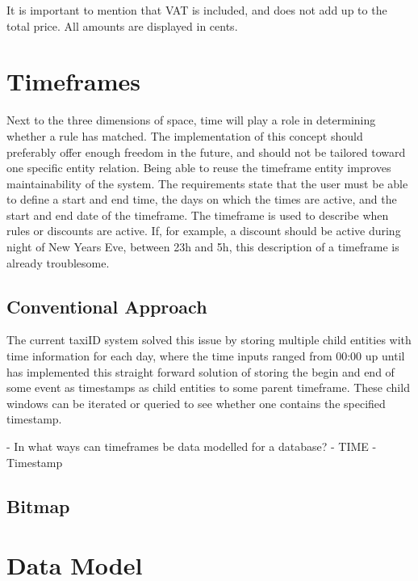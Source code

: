 It is important to mention that VAT is included, and does not add up to the total price. All amounts are displayed in cents.

%
\section{Timeframes}
Next to the three dimensions of space, time will play a role in determining whether a rule has matched. The implementation of this concept should preferably offer enough freedom in the future, and should not be tailored toward one specific entity relation. Being able to reuse the timeframe entity improves maintainability of the system. The requirements state that the user must be able to define a start and end time, the days on which the times are active, and the start and end date of the timeframe. The timeframe is used to describe when rules or discounts are active. If, for example, a discount should be active during night of New Years Eve, between 23h and 5h, this description of a timeframe is already troublesome.

\subsection{Conventional Approach}
The current taxiID system solved this issue by storing multiple child entities with time information for each day, where the time inputs ranged from 00:00 up until
has implemented this straight forward solution of storing the begin and end  of some event as timestamps as child entities to some parent timeframe. These child windows can be iterated or queried to see whether one contains the specified timestamp.

- In what ways can timeframes be data modelled for a database?
	- TIME
	- Timestamp

\subsection{Bitmap}

%
\section{Data Model}


